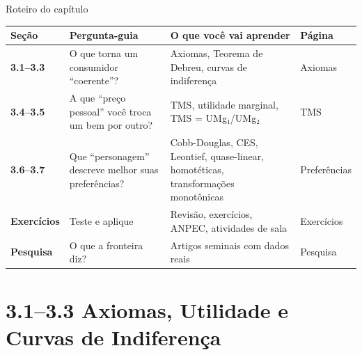 \documentclass[11pt,twoside,openright]{book}
\begin{document}
\begin{theorembox}{Roteiro do capítulo}

{\def\LTcaptype{none} %
\begin{longtable}[]{@{}
  >{\centering\arraybackslash}p{}
  >{\raggedright\arraybackslash}p{}
  >{\raggedright\arraybackslash}p{}
  >{\centering\arraybackslash}p{}@{}}
\toprule\noalign{}
\begin{minipage}[b]{\linewidth}\centering
Seção
\end{minipage} & \begin{minipage}[b]{\linewidth}\raggedright
Pergunta-guia
\end{minipage} & \begin{minipage}[b]{\linewidth}\raggedright
O que você vai aprender
\end{minipage} & \begin{minipage}[b]{\linewidth}\centering
Página
\end{minipage} \\
\midrule\noalign{}
\endhead
\bottomrule\noalign{}
\endlastfoot
\textbf{3.1--3.3} & O que torna um consumidor ``coerente''? & Axiomas,
Teorema de Debreu, curvas de indiferença & Axiomas \\
\textbf{3.4--3.5} & A que ``preço pessoal'' você troca um bem por outro?
& TMS, utilidade marginal, TMS = UMg₁/UMg₂ & TMS \\
\textbf{3.6--3.7} & Que ``personagem'' descreve melhor suas
preferências? & Cobb-Douglas, CES, Leontief, quase-linear, homotéticas,
transformações monotônicas & Preferências \\
\textbf{Exercícios} & Teste e aplique & Revisão, exercícios, ANPEC,
atividades de sala & Exercícios \\
\textbf{Pesquisa} & O que a fronteira diz? & Artigos seminais com dados
reais & Pesquisa \\
\end{longtable}
}

\end{theorembox}

\chapter{3.1--3.3 Axiomas, Utilidade e Curvas de
Indiferença}\label{axiomas-utilidade-e-curvas-de-indiferenuxe7a}
\end{document}
